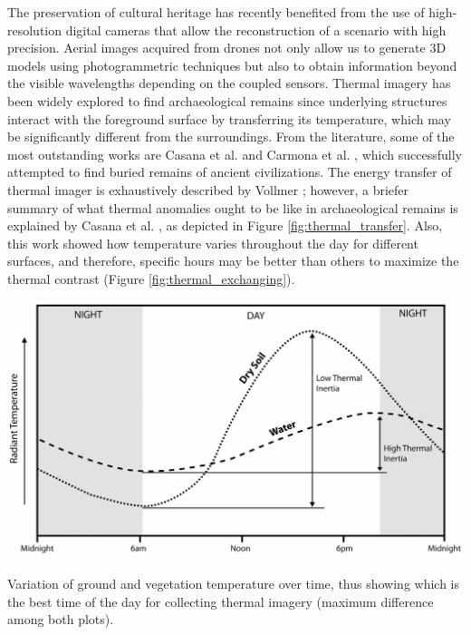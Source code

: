 The preservation of cultural heritage has recently benefited from the use of high-resolution digital cameras that allow the reconstruction of a scenario with high precision. Aerial images acquired from drones not only allow us to generate 3D models using photogrammetric techniques but also to obtain information beyond the visible wavelengths depending on the coupled sensors. Thermal imagery has been widely explored to find archaeological remains since underlying structures interact with the foreground surface by transferring its temperature, which may be significantly different from the surroundings. From the literature, some of the most outstanding works are Casana et al. \cite{casana_archaeological_2017} and Carmona et al. \cite{salgado_carmona_assessing_2020}, which successfully attempted to find buried remains of ancient civilizations. The energy transfer of thermal imager is exhaustively described by Vollmer \cite{vollmer_infrared_2017}; however, a briefer summary of what thermal anomalies ought to be like in archaeological remains is explained by Casana et al. \cite{casana_archaeological_2017}, as depicted in Figure \ref{fig:thermal_transfer}. Also, this work showed how temperature varies throughout the day for different surfaces, and therefore, specific hours may be better than others to maximize the thermal contrast (Figure \ref{fig:thermal_exchanging}).
\begin{marginfigure}[-5.0cm]
    \centering
    \includegraphics[width=\linewidth]{figs/castle_puerta_arenas/thermal_exchanging_day.png}
	\caption{Variation of ground and vegetation temperature over time, thus showing which is the best time of the day for collecting thermal imagery (maximum difference among both plots).}
	\label{fig:thermal_exchanging}
\end{marginfigure}

